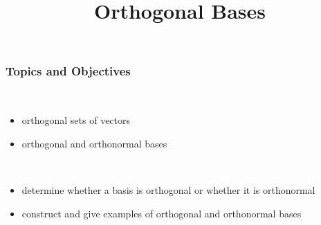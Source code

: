 \title{Orthogonal Bases}
\subtitle{\SubTitleName}
\institute[]{\Course}
\author{\Instructor}
\maketitle   
  

 
\begin{frame}\frametitle{Topics and Objectives}
 \\
\begin{itemize}

    \item orthogonal sets of vectors

    \item orthogonal and orthonormal bases 
    

\end{itemize}

\vspace{0.5cm}

\\

\LearningObjectiveStatement

\begin{itemize}
    \item determine whether a basis is orthogonal or whether it is orthonormal
    \item construct and give examples of orthogonal and orthonormal bases
\end{itemize}


\end{frame}


